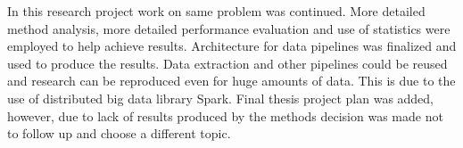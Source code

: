 \documentclass[a4paper,12pt]{article}
\begin{document}
	\vspace{5mm}
	
	In this research project work on same problem was continued. More detailed method analysis, more detailed performance evaluation and use of statistics were employed to help achieve results. Architecture for data pipelines was finalized and used to produce the results. Data extraction and other pipelines could be reused and research can be reproduced even for huge amounts of data. This is due to the use of distributed big data library Spark. Final thesis project plan was added, however, due to lack of results produced by the methods decision was made not to follow up and choose a different topic.
	
	\clearpage
	
\end{document}
